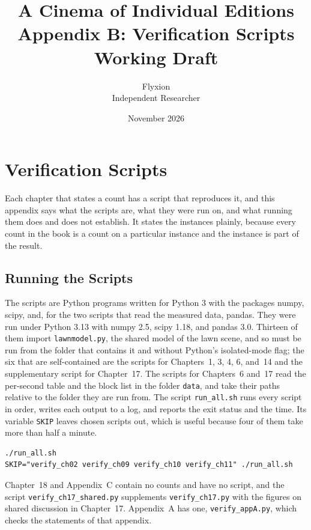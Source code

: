 \documentclass[11pt,twoside,openright]{book}
\title{\Huge\bfseries A Cinema of Individual Editions\\[1.2ex]
\large Appendix B: Verification Scripts\\[0.4ex]
\large Working Draft}
\author{Flyxion\\[0.3ex]\small Independent Researcher}
\date{November 2026}
\theoremstyle{plain}
\theoremstyle{definition}
\theoremstyle{remark}
\begin{document}
\frontmatter
\maketitle
\tableofcontents
\mainmatter
\appendix
\setcounter{chapter}{1}

\chapter{Verification Scripts}
\label{app:scripts}

Each chapter that states a count has a script that reproduces it, and this appendix says what the scripts are, what they were run on, and what running them does and does not establish. It states the instances plainly, because every count in the book is a count on a particular instance and the instance is part of the result.

\section{Running the Scripts}\label{sec:running}

The scripts are Python programs written for Python 3 with the packages numpy, scipy, and, for the two scripts that read the measured data, pandas. They were run under Python 3.13 with numpy 2.5, scipy 1.18, and pandas 3.0. Thirteen of them import \texttt{lawnmodel.py}, the shared model of the lawn scene, and so must be run from the folder that contains it and without Python's isolated-mode flag; the six that are self-contained are the scripts for Chapters~1, 3, 4, 6, and~14 and the supplementary script for Chapter~17. The scripts for Chapters~6 and~17 read the per-second table and the block list in the folder \texttt{data}, and take their paths relative to the folder they are run from. The script \texttt{run\_all.sh} runs every script in order, writes each output to a log, and reports the exit status and the time. Its variable \texttt{SKIP} leaves chosen scripts out, which is useful because four of them take more than half a minute.

\begin{verbatim}
./run_all.sh
SKIP="verify_ch02 verify_ch09 verify_ch10 verify_ch11" ./run_all.sh
\end{verbatim}

Chapter~18 and Appendix~C contain no counts and have no script, and the script \texttt{verify\_ch17\_shared.py} supplements \texttt{verify\_ch17.py} with the figures on shared discussion in Chapter~17. Appendix~A has one, \texttt{verify\_appA.py}, which checks the statements of that appendix.
\end{document}
